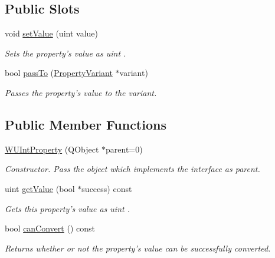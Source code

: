 \subsection*{Public Slots}
\begin{DoxyCompactItemize}
\item 
void \hyperlink{class_w_u_int_property_a05e1e1e89a9295007ffea09ea46a0ac4}{set\-Value} (uint value)
\begin{DoxyCompactList}\small\item\em Sets the property's value as uint . \end{DoxyCompactList}\item 
bool \hyperlink{class_w_u_int_property_adad4788a892a0c990d068f10863090d8}{pass\-To} (\hyperlink{class_property_variant}{Property\-Variant} $\ast$variant)
\begin{DoxyCompactList}\small\item\em Passes the property's value to the variant. \end{DoxyCompactList}\end{DoxyCompactItemize}
\subsection*{Public Member Functions}
\begin{DoxyCompactItemize}
\item 
\hyperlink{class_w_u_int_property_a7bd95ff163ad1bf9fcd995aff49919f5}{W\-U\-Int\-Property} (Q\-Object $\ast$parent=0)
\begin{DoxyCompactList}\small\item\em Constructor. Pass the object which implements the interface as parent. \end{DoxyCompactList}\item 
uint \hyperlink{class_w_u_int_property_af79534aa085135c8c642a1e929119147}{get\-Value} (bool $\ast$success) const 
\begin{DoxyCompactList}\small\item\em Gets this property's value as uint . \end{DoxyCompactList}\item 
bool \hyperlink{class_w_u_int_property_a27a4e53bf0702e796c6eecfbe9803221}{can\-Convert} () const 
\begin{DoxyCompactList}\small\item\em Returns whether or not the property's value can be successfully converted. \end{DoxyCompactList}\end{DoxyCompactItemize}
